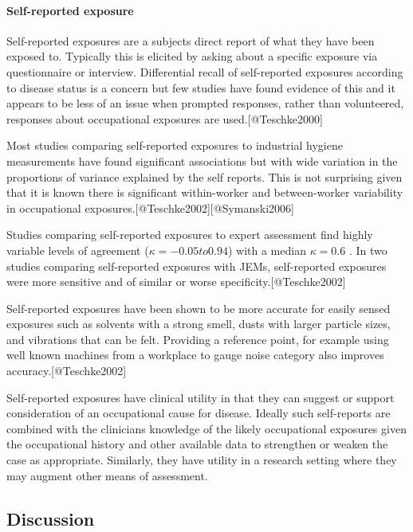 \documentclass[
]{article}
\begin{document}
\hypertarget{self-reported-exposure}{%
\paragraph{Self-reported exposure}\label{self-reported-exposure}}

Self-reported exposures are a subjects direct report of what they have
been exposed to. Typically this is elicited by asking about a specific
exposure via questionnaire or interview. Differential recall of
self-reported exposures according to disease status is a concern but few
studies have found evidence of this and it appears to be less of an
issue when prompted responses, rather than volunteered, responses about
occupational exposures are used.{[}@Teschke2000{]}

Most studies comparing self-reported exposures to industrial hygiene
measurements have found significant associations but with wide variation
in the proportions of variance explained by the self reports. This is
not surprising given that it is known there is significant within-worker
and between-worker variability in occupational
exposures.{[}@Teschke2002{]}{[}@Symanski2006{]}

Studies comparing self-reported exposures to expert assessment find
highly variable levels of agreement
(\ensuremath{\kappa = -0.05 to 0.94}) with a median
\ensuremath{\kappa = 0.6} . In two studies comparing self-reported
exposures with JEMs, self-reported exposures were more sensitive and of
similar or worse specificity.{[}@Teschke2002{]}

Self-reported exposures have been shown to be more accurate for easily
sensed exposures such as solvents with a strong smell, dusts with larger
particle sizes, and vibrations that can be felt. Providing a reference
point, for example using well known machines from a workplace to gauge
noise category also improves accuracy.{[}@Teschke2002{]}

Self-reported exposures have clinical utility in that they can suggest
or support consideration of an occupational cause for disease. Ideally
such self-reports are combined with the clinicians knowledge of the
likely occupational exposures given the occupational history and other
available data to strengthen or weaken the case as appropriate.
Similarly, they have utility in a research setting where they may
augment other means of assessment.

\hypertarget{discussion-2}{%
\subsection{Discussion}\label{discussion-2}}
\end{document}

